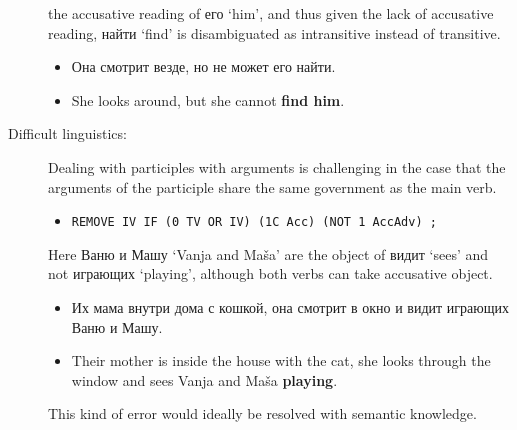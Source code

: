 \documentclass[11pt]{article}
\newcommand{\rus}[1]{\foreignlanguage{russian}{#1}}
\begin{document}
\begin{description}
  the accusative reading of \rus{его} `him', and thus given the lack of accusative reading, \rus{найти} `find'
  is disambiguated as intransitive instead of transitive.
  \begin{itemize}
    \item \rus{Она смотрит везде, но не может его найти.}
    \item She looks around, but she cannot \textbf{find him}.
  \end{itemize}
  \item[ Difficult linguistics:] Dealing with participles with arguments is challenging in the case that the arguments 
    of the participle share the same government as the main verb.
  \begin{itemize}
    \item \texttt{REMOVE IV IF (0 TV OR IV) (1C Acc) (NOT 1 AccAdv) ;}
  \end{itemize}
    Here \rus{Ваню и Машу} `Vanja and Maša' are the object of \rus{видит} `sees' and not \rus{играющих} `playing', although
    both verbs can take accusative object.
  \begin{itemize}
    \item \rus{Их мама внутри дома с кошкой, она смотрит в окно и видит играющих Ваню и Машу.}
    \item Their mother is inside the house with the cat, she looks through the window and sees Vanja and Maša \textbf{playing}.
  \end{itemize}
    This kind of error would ideally be resolved with semantic knowledge. 
\end{description}




\end{document}

